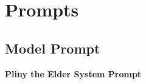 \documentclass[sigconf]{aamas}
\begin{document}


 



\appendix

\section{Prompts}

\subsection{Model Prompt}
\label{appendix:ModelPrompt}

\textbf{Pliny the Elder System Prompt}
\end{document}
